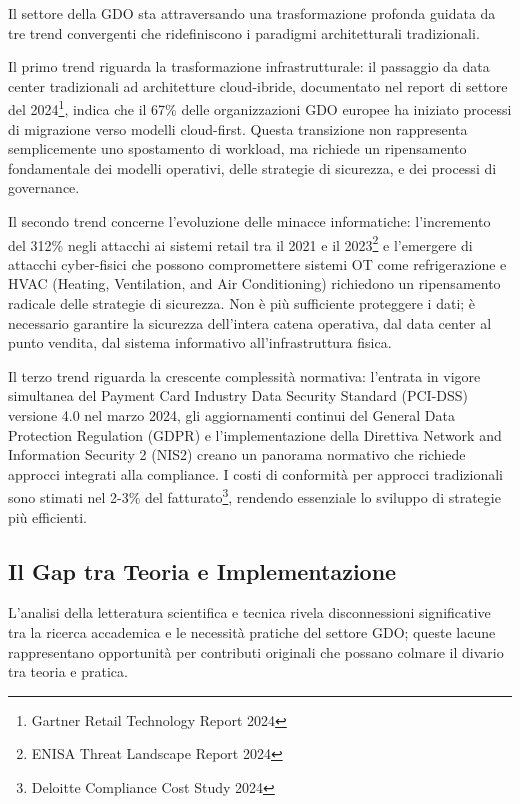 Il settore della GDO sta attraversando una trasformazione profonda guidata da tre trend convergenti che ridefiniscono i paradigmi architetturali tradizionali.

Il primo trend riguarda la trasformazione infrastrutturale: il passaggio da data center tradizionali ad architetture cloud-ibride, documentato nel report di settore del 2024\footnote{Gartner Retail Technology Report 2024}, indica che il 67\% delle organizzazioni GDO europee ha iniziato processi di migrazione verso modelli cloud-first. Questa transizione non rappresenta semplicemente uno spostamento di workload, ma richiede un ripensamento fondamentale dei modelli operativi, delle strategie di sicurezza, e dei processi di governance.

Il secondo trend concerne l'evoluzione delle minacce informatiche: l'incremento del 312\% negli attacchi ai sistemi retail tra il 2021 e il 2023\footnote{ENISA Threat Landscape Report 2024} e l'emergere di attacchi cyber-fisici che possono compromettere sistemi OT come refrigerazione e HVAC (Heating, Ventilation, and Air Conditioning) richiedono un ripensamento radicale delle strategie di sicurezza. Non è più sufficiente proteggere i dati; è necessario garantire la sicurezza dell'intera catena operativa, dal data center al punto vendita, dal sistema informativo all'infrastruttura fisica.

Il terzo trend riguarda la crescente complessità normativa: l'entrata in vigore simultanea del Payment Card Industry Data Security Standard (PCI-DSS) versione 4.0 nel marzo 2024, gli aggiornamenti continui del General Data Protection Regulation (GDPR) e l'implementazione della Direttiva Network and Information Security 2 (NIS2) creano un panorama normativo che richiede approcci integrati alla compliance. I costi di conformità per approcci tradizionali sono stimati nel 2-3\% del fatturato\footnote{Deloitte Compliance Cost Study 2024}, rendendo essenziale lo sviluppo di strategie più efficienti.

\subsection{Il Gap tra Teoria e Implementazione}

L'analisi della letteratura scientifica e tecnica rivela disconnessioni significative tra la ricerca accademica e le necessità pratiche del settore GDO; queste lacune rappresentano opportunità per contributi originali che possano colmare il divario tra teoria e pratica.

